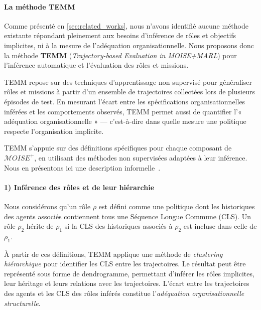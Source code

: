 \paragraph{La méthode TEMM}
\label{sec:TEMM_algorithm}

Comme présenté en \autoref{sec:related_works}, nous n'avons identifié aucune méthode existante répondant pleinement aux besoins d'inférence de rôles et objectifs implicites, ni à la mesure de l'adéquation organisationnelle. Nous proposons donc la méthode \textbf{TEMM} (\textit{Trajectory-based Evaluation in MOISE+MARL}) pour l'inférence automatique et l'évaluation des rôles et missions.

TEMM repose sur des techniques d'apprentissage non supervisé pour généraliser rôles et missions à partir d'un ensemble de trajectoires collectées lors de plusieurs épisodes de test. En mesurant l'écart entre les spécifications organisationnelles inférées et les comportements observés, TEMM permet aussi de quantifier l'« adéquation organisationnelle » — c'est-à-dire dans quelle mesure une politique respecte l'organisation implicite.

TEMM s'appuie sur des définitions spécifiques pour chaque composant de $\mathcal{M}OISE^+$, en utilisant des méthodes non supervisées adaptées à leur inférence. Nous en présentons ici une description informelle~\hyperref[fn:github]{\footnotemark[1]}.
%

\paragraph{1) Inférence des rôles et de leur hiérarchie}

Nous considérons qu'un rôle $\rho$ est défini comme une politique dont les historiques des agents associés contiennent tous une Séquence Longue Commune (CLS). Un rôle $\rho_2$ hérite de $\rho_1$ si la CLS des historiques associés à $\rho_2$ est incluse dans celle de $\rho_1$.

À partir de ces définitions, TEMM applique une méthode de \textit{clustering hiérarchique} pour identifier les CLS entre les trajectoires. Le résultat peut être représenté sous forme de dendrogramme, permettant d'inférer les rôles implicites, leur héritage et leurs relations avec les trajectoires.
L'écart entre les trajectoires des agents et les CLS des rôles inférés constitue l'\textit{adéquation organisationnelle structurelle}.

